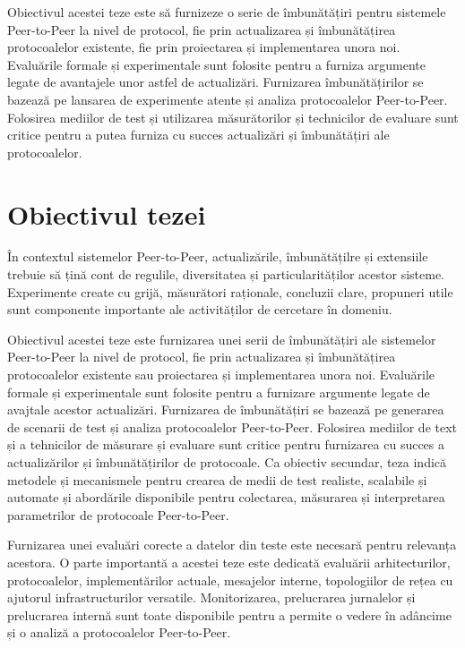 Obiectivul acestei teze este să furnizeze o serie de îmbunătățiri pentru
sistemele Peer-to-Peer la nivel de protocol, fie prin actualizarea și
îmbunătățirea protocoalelor existente, fie prin proiectarea și implementarea
unora noi. Evaluările formale și experimentale sunt folosite pentru a furniza
argumente legate de avantajele unor astfel de actualizări. Furnizarea
îmbunătățirilor se bazează pe lansarea de experimente atente și analiza
protocoalelor Peer-to-Peer. Folosirea mediilor de test și utilizarea
măsurătorilor și technicilor de evaluare sunt critice pentru a putea furniza
cu succes actualizări și îmbunătățiri ale protocoalelor.

\section{Obiectivul tezei}
\label{sec:intro:objective}

În contextul sistemelor Peer-to-Peer, actualizările, îmbunătățilre și
extensiile trebuie să țină cont de regulile, diversitatea și
particularităților acestor sisteme. Experimente create cu grijă, măsurători
raționale, concluzii clare, propuneri utile sunt componente importante ale
activităților de cercetare în domeniu.

Obiectivul acestei teze este furnizarea unei serii de îmbunătățiri ale
sistemelor Peer-to-Peer la nivel de protocol, fie prin actualizarea și
îmbunătățirea protocoalelor existente sau proiectarea și implementarea unora
noi. Evaluările formale și experimentale sunt folosite pentru a furnizare
argumente legate de avajtale acestor actualizări. Furnizarea de îmbunătățiri
se bazează pe generarea de scenarii de test și analiza protocoalelor
Peer-to-Peer. Folosirea mediilor de text și a tehnicilor de măsurare și
evaluare sunt critice pentru furnizarea cu succes a actualizărilor și
îmbunătățirilor de protocoale. Ca obiectiv secundar, teza indică metodele și
mecanismele pentru crearea de medii de test realiste, scalabile și automate și
abordările disponibile pentru colectarea, măsurarea și interpretarea
parametrilor de protocoale Peer-to-Peer.

Furnizarea unei evaluări corecte a datelor din teste este necesară pentru
relevanța acestora. O parte importantă a acestei teze este dedicată evaluării
arhitecturilor, protocoalelor, implementărilor actuale, mesajelor interne,
topologiilor de rețea cu ajutorul infrastructurilor versatile. Monitorizarea,
prelucrarea jurnalelor și prelucrarea internă sunt toate disponibile pentru a
permite o vedere în adâncime și o analiză a protocoalelor Peer-to-Peer.

